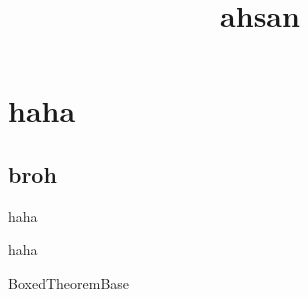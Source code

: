 \documentclass[a4paper, 11pt]{memoir}
\title{\vspace{-3em}\bfseries ahsan\vspace{-1em}}
\begin{document}
\maketitle

\chapter{haha}

\section{broh}

\begin{lemma}[broh]
    haha
\end{lemma}


\begin{lemma}
    haha
\end{lemma}


\begin{problem}[mabr]
    BoxedTheoremBase
\end{problem}



\printindex[prob]
\end{document}
